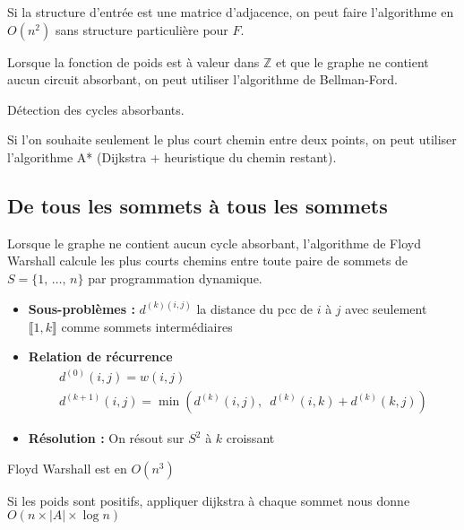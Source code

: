 \begin{rem}
	Si la structure d'entrée est une matrice d'adjacence, on peut faire l'algorithme en $O(n^2)$ sans structure particulière pour $F$.
\end{rem}

\begin{rem}
	Lorsque la fonction de poids est à valeur dans $\mathbb Z$ et que le graphe ne contient aucun circuit absorbant, on peut utiliser l'algorithme de Bellman-Ford.
\end{rem}

\begin{appl}
	Détection des cycles absorbants.
\end{appl}

\begin{rem}
	Si l'on souhaite seulement le plus court chemin entre deux points, on peut utiliser l'algorithme A* (Dijkstra + heuristique du chemin restant).
\end{rem}

\subsection{De tous les sommets à tous les sommets}

Lorsque le graphe ne contient aucun cycle absorbant, l'algorithme de Floyd Warshall calcule les plus courts chemins entre toute paire de sommets de $S=\{1, \, \dots , \,n\}$ par programmation dynamique. \begin{itemize}[label=$\star$]
	\item \textbf{Sous-problèmes :} $d^{(k)(i,j)}$ la distance du pcc de $i$ à $j$ avec seulement $\llbracket 1, k \rrbracket$ comme sommets intermédiaires
	\item \textbf{Relation de récurrence}
	$$ \begin{array}{l}
		d^{(0)}(i,j) = w(i,j)\\
		d^{(k+1)}(i,j) = \min\left(d^{(k)}(i,j), \enspace d^{(k)}(i,k) + d^{(k)}(k, j)\right)
	\end{array} $$
	\item \textbf{Résolution :} On résout sur $S^2$ à $k$ croissant
\end{itemize}

\begin{proposition}
	Floyd Warshall est en $O(n^3)$
\end{proposition}

\begin{rem}
	Si les poids sont positifs, appliquer dijkstra à chaque sommet nous donne $O(n \times |A| \times \log n)$
\end{rem}

